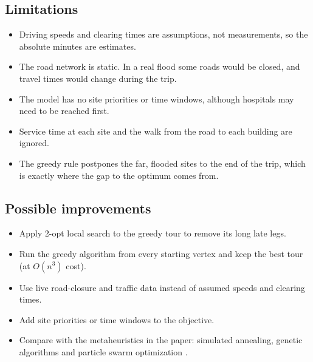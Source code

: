 \documentclass[11pt,a4paper]{article}
\begin{document}
\subsection{Limitations}
\begin{itemize}[noitemsep]
  \item Driving speeds and clearing times are assumptions, not measurements, so the absolute minutes are estimates.
  \item The road network is static. In a real flood some roads would be closed, and travel times would change during the trip.
  \item The model has no site priorities or time windows, although hospitals may need to be reached first.
  \item Service time at each site and the walk from the road to each building are ignored.
  \item The greedy rule postpones the far, flooded sites to the end of the trip, which is exactly where the gap to the optimum comes from.
\end{itemize}

\subsection{Possible improvements}
\begin{itemize}[noitemsep]
  \item Apply 2-opt local search \cite{croes1958} to the greedy tour to remove its long late legs.
  \item Run the greedy algorithm from every starting vertex and keep the best tour (at $O(n^3)$ cost).
  \item Use live road-closure and traffic data instead of assumed speeds and clearing times.
  \item Add site priorities or time windows to the objective.
  \item Compare with the metaheuristics in the paper: simulated annealing, genetic algorithms and particle swarm optimization \cite{luna2024}.
\end{itemize}
\end{document}
